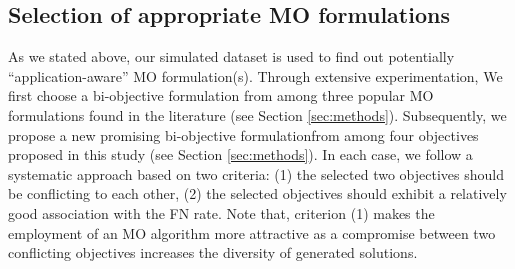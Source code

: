 \subsection{Selection of appropriate MO formulations}
\label{sec:selection_msa_formulation}
As we stated above, our simulated dataset is used to find out potentially ``application-aware'' MO formulation(s). Through extensive experimentation, We first choose a bi-objective formulation from among three popular MO formulations found in the literature (see Section \ref{sec:methods}). Subsequently, we propose a new promising bi-objective formulationfrom among four objectives proposed in this study (see Section \ref{sec:methods}). In each case, we follow a systematic approach based on two criteria: (1) the selected two objectives should be conflicting to each other, (2) the selected objectives should exhibit a relatively good association with the FN rate. Note that, criterion (1) makes the employment of an MO algorithm more attractive as a compromise between two conflicting objectives increases the diversity of generated solutions. 
